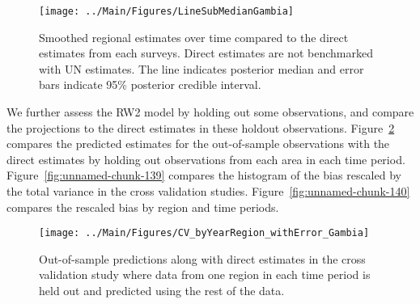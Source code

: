 \documentclass[12pt]{article}\usepackage[]{graphicx}\usepackage[]{color}
\newenvironment{knitrout}{}{} %
\begin{document}
\begin{knitrout}
\color{fgcolor}\begin{figure}[bht]

{\centering \texttt{[image: ../Main/Figures/LineSubMedianGambia]} 

}

\caption[Smoothed regional estimates over time compared to the direct estimates from each surveys]{Smoothed regional estimates over time compared to the direct estimates from each surveys. Direct estimates are not benchmarked with UN estimates. The line indicates posterior median and error bars indicate 95\% posterior credible interval.}\label{fig:unnamed-chunk-137}
\end{figure}


\end{knitrout}
We further assess the RW2 model by holding out some observations, and compare the projections to the direct estimates in these holdout observations. Figure~\ref{fig:unnamed-chunk-138} compares the predicted estimates for the out-of-sample observations  with the direct estimates by holding out observations from each area in each time period.  Figure~\ref{fig:unnamed-chunk-139} compares the histogram of the bias rescaled by the total variance in the cross validation studies. Figure~\ref{fig:unnamed-chunk-140} compares the rescaled bias by region and time periods.



 
\begin{knitrout}
\color{fgcolor}\begin{figure}[bht]

{\centering \texttt{[image: ../Main/Figures/CV\_byYearRegion\_withError\_Gambia]} 

}

\caption[Out-of-sample predictions along with direct estimates in the cross validation study where data from one region in each time period is held out and predicted using the rest of the data]{Out-of-sample predictions along with direct estimates in the cross validation study where data from one region in each time period is held out and predicted using the rest of the data.}\label{fig:unnamed-chunk-138}
\end{figure}


\end{knitrout}
\end{document}
